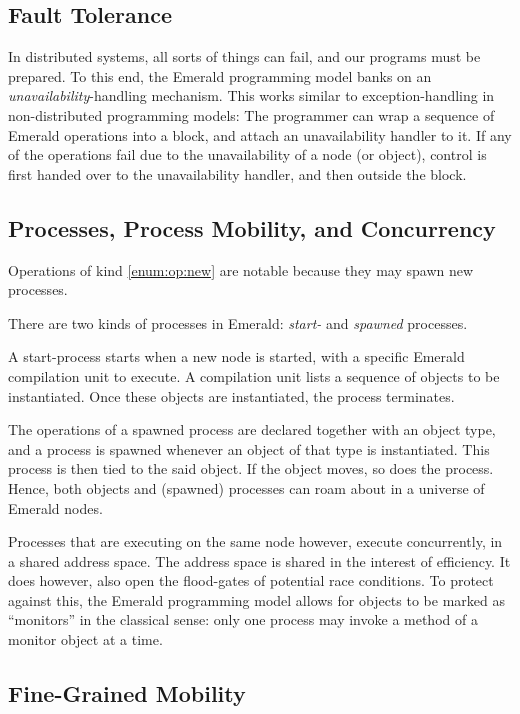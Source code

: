 \subsection{Fault Tolerance}

In distributed systems, all sorts of things can fail, and our programs
must be prepared. To this end, the Emerald programming model banks on
an \emph{unavailability}-handling mechanism. This works similar to
exception-handling in non-distributed programming models: The
programmer can wrap a sequence of Emerald operations into a block, and
attach an unavailability handler to it. If any of the operations fail
due to the unavailability of a node (or object), control is first
handed over to the unavailability handler, and then outside the block.

\subsection{Processes, Process Mobility, and Concurrency}

Operations of kind \ref{enum:op:new} are notable because they may
spawn new processes.

There are two kinds of processes in Emerald: \emph{start-} and
\emph{spawned} processes.

A start-process starts when a new node is started, with a specific
Emerald compilation unit to execute. A compilation unit lists a
sequence of objects to be instantiated. Once these objects are
instantiated, the process terminates.

The operations of a spawned process are declared together with an
object type, and a process is spawned whenever an object of that type
is instantiated.  This process is then tied to the said object. If the
object moves, so does the process. Hence, both objects and (spawned)
processes can roam about in a universe of Emerald nodes.

Processes that are executing on the same node however, execute
concurrently, in a shared address space. The address space is shared
in the interest of efficiency. It does however, also open the
flood-gates of potential race conditions. To protect against this, the
Emerald programming model allows for objects to be marked as
``monitors'' in the classical sense: only one process may invoke a
method of a monitor object at a time.

\subsection{Fine-Grained Mobility}

